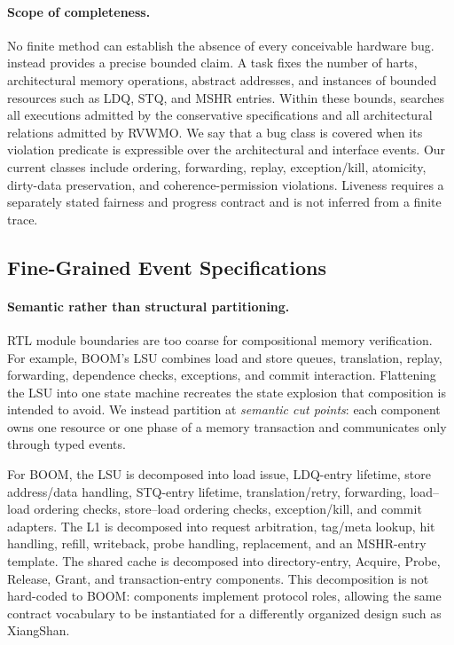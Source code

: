 \paragraph{Scope of completeness.}
No finite method can establish the absence of every conceivable hardware bug.
\sys{} instead provides a precise bounded claim.  A task fixes the number of
harts, architectural memory operations, abstract addresses, and instances of
bounded resources such as LDQ, STQ, and MSHR entries.  Within these bounds,
\sys{} searches all executions admitted by the conservative specifications and
all architectural relations admitted by RVWMO.  We say that a bug class is
covered when its violation predicate is expressible over the architectural and
interface events.  Our current classes include ordering, forwarding, replay,
exception/kill, atomicity, dirty-data preservation, and coherence-permission
violations.  Liveness requires a separately stated fairness and progress
contract and is not inferred from a finite trace.

\subsection{Fine-Grained Event Specifications}
\label{sec:specification}

\paragraph{Semantic rather than structural partitioning.}
RTL module boundaries are too coarse for compositional memory verification.
For example, BOOM's LSU combines load and store queues, translation, replay,
forwarding, dependence checks, exceptions, and commit interaction.  Flattening
the LSU into one state machine recreates the state explosion that composition
is intended to avoid.  We instead partition at \emph{semantic cut points}:
each component owns one resource or one phase of a memory transaction and
communicates only through typed events.

For BOOM, the LSU is decomposed into load issue, LDQ-entry lifetime, store
address/data handling, STQ-entry lifetime, translation/retry, forwarding,
load--load ordering checks, store--load ordering checks, exception/kill, and
commit adapters.  The L1 is decomposed into request arbitration, tag/meta
lookup, hit handling, refill, writeback, probe handling, replacement, and an
MSHR-entry template.  The shared cache is decomposed into directory-entry,
Acquire, Probe, Release, Grant, and transaction-entry components.  This
decomposition is not hard-coded to BOOM: components implement protocol roles,
allowing the same contract vocabulary to be instantiated for a differently
organized design such as XiangShan.

